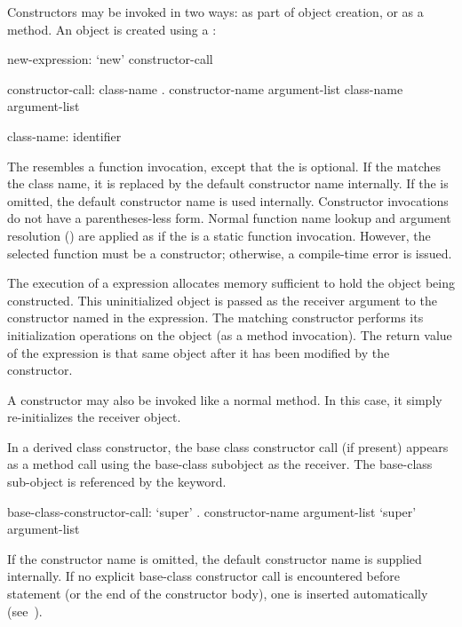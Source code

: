 Constructors may be invoked in two ways: as part of object creation, or as
a method.  An object is created using a :
\begin{syntax}
new-expression:
  `new' constructor-call

constructor-call:
  class-name . constructor-name argument-list
  class-name argument-list

class-name:
  identifier
\end{syntax}
\noindent
The  resembles a function invocation, except that
the  is optional.
If the  matches the class name, it is replaced by the
default constructor name internally.
If the  is omitted, the default constructor
name is used internally.  Constructor invocations do not have a
parentheses-less form.  Normal function name lookup and argument resolution
() are applied as if the  is a
static function invocation.  However, the selected function must be a
constructor; otherwise, a compile-time error is issued.

The execution of a  expression allocates memory sufficient to hold the
object being constructed.  This uninitialized object is passed as the receiver
argument to the constructor named in the  expression.  The matching constructor
performs its initialization operations on the object (as a method invocation).
The return value of the  expression is that same object after it has
been modified by the constructor.  

A constructor may also be invoked like a normal method.  In this case, it
simply re-initializes the receiver object.

In a derived class constructor, the base class constructor call (if present)
appears as a method call using the base-class subobject as the receiver.  The
base-class sub-object is referenced by the  keyword.

\begin{syntax}
base-class-constructor-call:
  `super' . constructor-name argument-list
  `super' argument-list
\end{syntax}

If the constructor name is omitted, the default constructor name 
is supplied internally.  If no explicit base-class constructor call is
encountered before  statement (or the end of the constructor body),
one is inserted automatically (see~).

